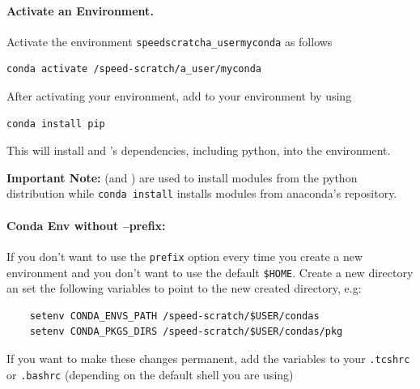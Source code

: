 \documentclass{easychair}
\begin{document}
\paragraph{Activate an Environment.}

Activate the environment \texttt{\/speed\-scratch\/a\_user\/myconda} as follows
\begin{verbatim}
conda activate /speed-scratch/a_user/myconda
\end{verbatim}
After activating your environment, add  to your environment by using 
\begin{verbatim}
conda install pip
\end{verbatim}
This will install  and 's dependencies, including python, 
into the environment.


\noindent
\textbf{Important Note:}  (and ) are used to install modules
from the python distribution while \texttt{conda install} installs modules from 
anaconda's repository.

\paragraph{Conda Env without --prefix: }

If you don't want to use the \texttt{\-\-prefix} option every time you create a new environment and you don't want to use the default \texttt{\-\$HOME}.
Create a new directory an set the following variables to point to the new created directory, e.g:
\begin{verbatim}
	setenv CONDA_ENVS_PATH /speed-scratch/$USER/condas
	setenv CONDA_PKGS_DIRS /speed-scratch/$USER/condas/pkg
\end{verbatim}
If you want to make these changes permanent, add the variables to your \texttt{.tcshrc} or \texttt{.bashrc} (depending on the default shell you are using)
\end{document}
